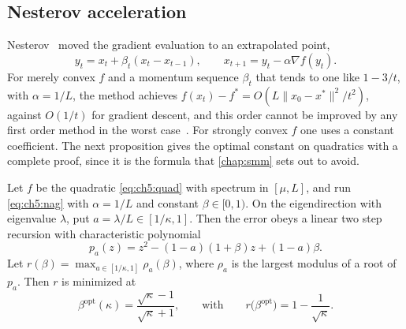 \subsection{Nesterov acceleration}

Nesterov~\cite{nesterov1983} moved the gradient evaluation to an extrapolated
point,
\begin{equation}\label{eq:ch5:nag}
  y_t=x_t+\beta_t(x_t-x_{t-1}),\qquad x_{t+1}=y_t-\alpha\nabla f(y_t).
\end{equation}
For merely convex $f$ and a momentum sequence $\beta_t$ that tends to one like
$1-3/t$, with $\alpha=1/L$, the method achieves
$f(x_t)-f^\ast=O(L\|x_0-x^\ast\|^2/t^2)$, against $O(1/t)$ for gradient
descent, and this order cannot be improved by any first order method in the
worst case~\cite{nesterov2004}.  For strongly convex $f$ one uses a constant
coefficient.  The next proposition gives the optimal constant on quadratics
with a complete proof, since it is the formula that \cref{chap:smm} sets out
to avoid.

\begin{proposition}\label{prop:ch5:nagquad}
Let $f$ be the quadratic \eqref{eq:ch5:quad} with spectrum in $[\mu,L]$, and
run \eqref{eq:ch5:nag} with $\alpha=1/L$ and constant $\beta\in[0,1)$.  On the
eigendirection with eigenvalue $\lambda$, put $a=\lambda/L\in[1/\kappa,1]$.
Then the error obeys a linear two step recursion with characteristic
polynomial
\begin{equation}\label{eq:ch5:charpoly}
  p_a(z)=z^2-(1-a)(1+\beta)z+(1-a)\beta .
\end{equation}
Let $r(\beta)=\max_{a\in[1/\kappa,1]}\rho_a(\beta)$, where $\rho_a$ is the
largest modulus of a root of $p_a$.  Then $r$ is minimized at
\begin{equation}\label{eq:ch5:betaopt}
  \beta^{\mathrm{opt}}(\kappa)=\frac{\sqrt\kappa-1}{\sqrt\kappa+1},
  \qquad\text{with}\qquad r\bigl(\beta^{\mathrm{opt}}\bigr)=1-\frac1{\sqrt\kappa}.
\end{equation}
\end{proposition}

